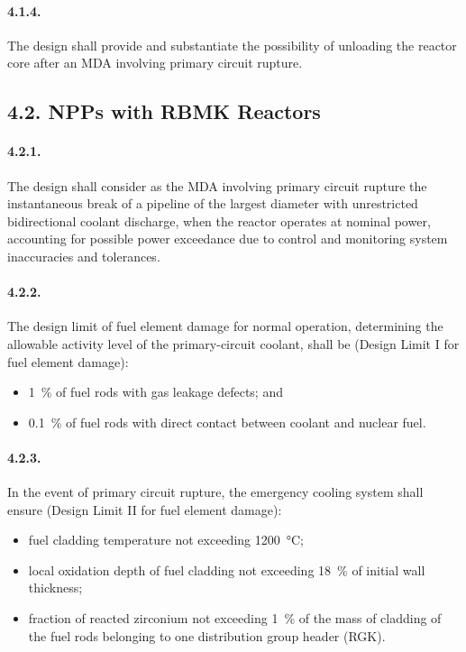 \documentclass[openright]{bookest}
\begin{document}
\paragraph{4.1.4.}
The design shall provide and substantiate the possibility of unloading the reactor core after an MDA involving primary circuit rupture.

\subsection*{4.2. NPPs with RBMK Reactors}

\paragraph{4.2.1.}
The design shall consider as the MDA involving primary circuit rupture the instantaneous break of a pipeline of the largest diameter with unrestricted bidirectional coolant discharge, when the reactor operates at nominal power, accounting for possible power exceedance due to control and monitoring system inaccuracies and tolerances.

\paragraph{4.2.2.}
The design limit of fuel element damage for normal operation, determining the allowable activity level of the primary-circuit coolant, shall be (Design Limit I for fuel element damage):
\begin{itemize}
    \item \qty{1}{\percent} of fuel rods with gas leakage defects; and
    \item \qty{0.1}{\percent} of fuel rods with direct contact between coolant and nuclear fuel.
\end{itemize}

\paragraph{4.2.3.}
In the event of primary circuit rupture, the emergency cooling system shall ensure (Design Limit II for fuel element damage):
\begin{itemize}
    \item fuel cladding temperature not exceeding \qty{1200}{\celsius};
    \item local oxidation depth of fuel cladding not exceeding \qty{18}{\percent} of initial wall thickness;
    \item fraction of reacted zirconium not exceeding \qty{1}{\percent} of the mass of cladding of the fuel rods belonging to one distribution group header (RGK).
\end{itemize}
\end{document}
